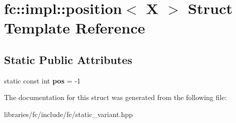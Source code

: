 \hypertarget{structfc_1_1impl_1_1position_3_01_x_01_4}{}\section{fc\+:\+:impl\+:\+:position$<$ X $>$ Struct Template Reference}
\label{structfc_1_1impl_1_1position_3_01_x_01_4}
\subsection*{Static Public Attributes}
\begin{DoxyCompactItemize}
\item 
\mbox{\label{structfc_1_1impl_1_1position_3_01_x_01_4_a8f8aa4035cbb878b74b1c4c3b1e9d209}} 
static const int {\bfseries pos} = -\/1
\end{DoxyCompactItemize}


The documentation for this struct was generated from the following file\+:\begin{DoxyCompactItemize}
\item 
libraries/fc/include/fc/static\+\_\+variant.\+hpp\end{DoxyCompactItemize}

